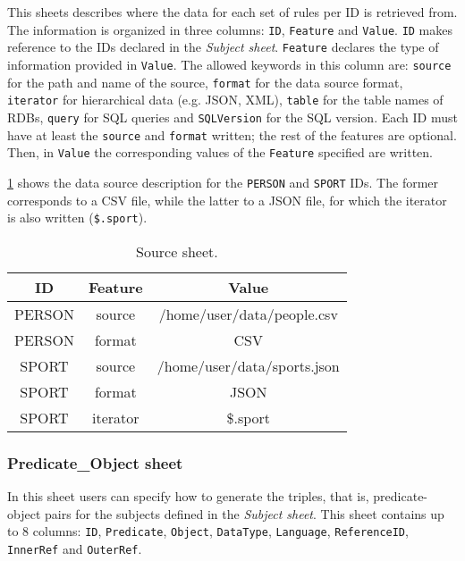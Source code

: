 This sheets describes where the data for each set of rules per ID is retrieved from. The information is organized in three columns: \texttt{ID}, \texttt{Feature} and \texttt{Value}. 
\texttt{ID} makes reference to the IDs declared in the \textit{Subject sheet}. 
\texttt{Feature} declares the type of information provided in \texttt{Value}. The allowed keywords in this column are: \texttt{source} for the path and name of the source, \texttt{format} for the data source format, \texttt{iterator} for hierarchical data (e.g. JSON, XML), \texttt{table} for the table names of RDBs, \texttt{query} for SQL queries and \texttt{SQLVersion} for the SQL version. Each ID must have at least the \texttt{source} and \texttt{format} written; the rest of the features are optional. 
Then, in \texttt{Value} the corresponding values of the \texttt{Feature} specified are written. 

\cref{tab:source_sheet} shows the data source description for the \texttt{PERSON} and \texttt{SPORT} IDs. The former corresponds to a CSV file, while the latter to a JSON file, for which the iterator is also written (\texttt{\$.sport}). 

\begin{table}[h!]
\caption{Source sheet.}
\label{tab:source_sheet}
\centering
\begin{tabular}{c|c|c}
\midrule
\textbf{ID} & \textbf{Feature} & \textbf{Value}              \\ \midrule
PERSON    & source          & /home/user/data/people.csv  \\
PERSON    & format          & CSV                         \\
SPORT     & source          & /home/user/data/sports.json \\
SPORT     & format          & JSON                        \\  
SPORT     & iterator        & \$.sport                    \\ \midrule
\end{tabular}
\end{table}

\subsubsection{Predicate\_Object sheet} In this sheet users can specify how to generate the triples, that is, predicate-object pairs for the subjects defined in the \textit{Subject sheet}. This sheet contains up to 8 columns: \texttt{ID}, \texttt{Predicate}, \texttt{Object}, \texttt{DataType}, \texttt{Language}, \texttt{ReferenceID}, \texttt{InnerRef} and \texttt{OuterRef}.


